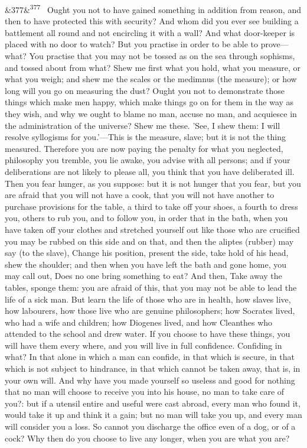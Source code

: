 \documentclass[12pt]{article}
\newcommand{\para}[1][]{\par\noindent\ifx&#1&\else\textsuperscript{\footnotesize #1}~\fi}
\begin{document}
\para[377] Ought you not to have gained something in addition from reason, and then to have protected this with security? And whom did you ever see building a battlement all round and not encircling it with a wall? And what door-keeper is placed with no door to watch? But you practise in order to be able to prove—what? You practise that you may not be tossed as on the sea through sophisms, and tossed about from what? Shew me first what you hold, what you measure, or what you weigh; and shew me the scales or the medimnus (the measure); or how long will you go on measuring the dust? Ought you not to demonstrate those things which make men happy, which make things go on for them in the way as they wish, and why we ought to blame no man, accuse no man, and acquiesce in the administration of the universe? Shew me these. 'See, I shew them: I will resolve syllogisms for you.'—This is the measure, slave; but it is not the thing measured. Therefore you are now paying the penalty for what you neglected, philosophy you tremble, you lie awake, you advise with all persons; and if your deliberations are not likely to please all, you think that you have deliberated ill. Then you fear hunger, as you suppose: but it is not hunger that you fear, but you are afraid that you will not have a cook, that you will not have another to purchase provisions for the table, a third to take off your shoes, a fourth to dress you, others to rub you, and to follow you, in order that in the bath, when you have taken off your clothes and stretched yourself out like those who are crucified you may be rubbed on this side and on that, and then the aliptes (rubber) may say (to the slave), Change his position, present the side, take hold of his head, shew the shoulder; and then when you have left the bath and gone home, you may call out, Does no one bring something to eat? And then, Take away the tables, sponge them: you are afraid of this, that you may not be able to lead the life of a sick man. But learn the life of those who are in health, how slaves live, how labourers, how those live who are genuine philosophers; how Socrates lived, who had a wife and children; how Diogenes lived, and how Cleanthes who attended to the school and drew water. If you choose to have these things, you will have them every where, and you will live in full confidence. Confiding in what? In that alone in which a man can confide, in that which is secure, in that which is not subject to hindrance, in that which cannot be taken away, that is, in your own will. And why have you made yourself so useless and good for nothing that no man will choose to receive you into his house, no man to take care of you?: but if a utensil entire and useful were cast abroad, every man who found it, would take it up and think it a gain; but no man will take you up, and every man will consider you a loss. So cannot you discharge the office even of a dog, or of a cock? Why then do you choose to live any longer, when you are what you are?
\end{document}
